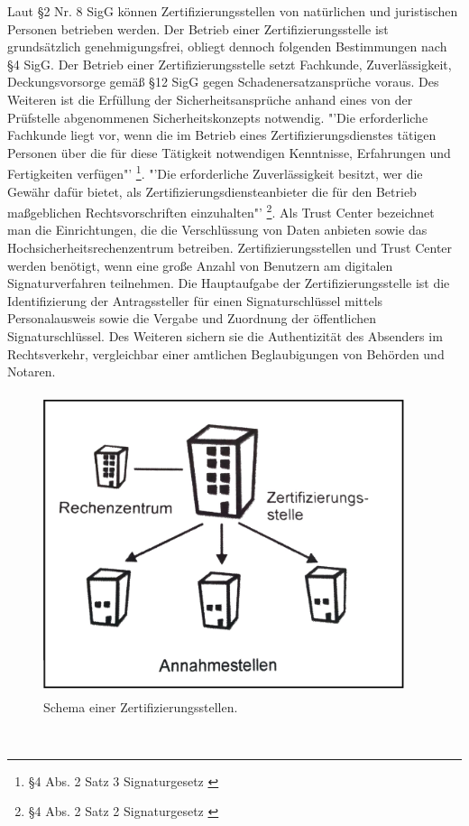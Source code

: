 Laut \S 2 Nr. 8 SigG können Zertifizierungsstellen von natürlichen und juristischen Personen betrieben werden. Der Betrieb einer Zertifizierungsstelle ist grundsätzlich genehmigungsfrei, obliegt dennoch folgenden Bestimmungen nach \S 4 SigG. Der Betrieb einer Zertifizierungsstelle setzt Fachkunde, Zuverlässigkeit, Deckungsvorsorge gemäß \S 12 SigG gegen Schadenersatzansprüche voraus. Des Weiteren ist die Erfüllung der Sicherheitsansprüche anhand eines von der Prüfstelle abgenommenen Sicherheitskonzepts notwendig. "'Die erforderliche Fachkunde liegt vor, wenn die im Betrieb eines Zertifizierungsdienstes tätigen Personen über die für diese Tätigkeit notwendigen Kenntnisse, Erfahrungen und Fertigkeiten verfügen"' \footnote{\S 4 Abs. 2 Satz 3 Signaturgesetz \cite{grundlagenFN2}}. "'Die erforderliche Zuverlässigkeit besitzt, wer die Gewähr dafür bietet, als Zertifizierungsdiensteanbieter die für den Betrieb maßgeblichen Rechtsvorschriften einzuhalten"' \footnote{\S 4 Abs. 2 Satz 2 Signaturgesetz \cite{grundlagenFN2}}. Als Trust Center bezeichnet man die Einrichtungen, die die Verschlüssung von Daten anbieten sowie das Hochsicherheitsrechenzentrum betreiben. Zertifizierungsstellen und Trust Center werden benötigt, wenn eine große Anzahl von Benutzern am digitalen Signaturverfahren teilnehmen. Die Hauptaufgabe der Zertifizierungsstelle ist die Identifizierung der Antragssteller für einen Signaturschlüssel mittels Personalausweis sowie die Vergabe und Zuordnung der öffentlichen Signaturschlüssel. Des Weiteren sichern sie die Authentizität des Absenders im Rechtsverkehr, vergleichbar einer amtlichen Beglaubigungen von Behörden und Notaren. \cite{standdeswissens3}\cite{zertstelle1} 
\begin{figure}[!ht]
    \centering
    \includegraphics[height=250pt, width=300pt]{trustcenterNeu3.jpg}
    \caption[Schema einer Zertifizierungsstellen]{\small{Schema einer Zertifizierungsstellen. \cite{trust1}}}
\end{figure}\\

